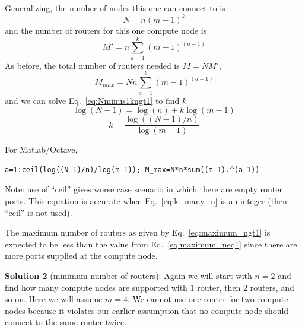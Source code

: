 \documentclass[pdftex]{article}
\begin{document}



Generalizing, the number of nodes this one can connect to is
\begin{equation}
 N=n(m-1)^k
 \label{eq:Nminus1kngt1}
\end{equation}
and the number of routers for this one compute node is
\begin{equation}
 M'=n\sum_{a=1}^{k} (m-1)^{(a-1)}
\end{equation}
As before, the total number of routers needed is $M=N M'$,
\begin{equation}
\boxed{
 M_{max}=N n\sum_{a=1}^{k} (m-1)^{(a-1)}
 }
 \label{eq:maximum_ngt1}
\end{equation}
and we can solve Eq.~\ref{eq:Nminus1kngt1} to find $k$
\begin{equation}
 \log(N-1)=\log(n) + k\log(m-1)
\end{equation}
\begin{equation}
 k=\frac{\log((N-1)/n)}{\log(m-1)}
 \label{eq:k_many_n}
\end{equation}

For Matlab/Octave,
\begin{verbatim}
a=1:ceil(log((N-1)/n)/log(m-1)); M_max=N*n*sum((m-1).^(a-1))
\end{verbatim}
Note: use of ``ceil'' gives worse case scenario in which there are empty router ports. This equation is accurate when Eq.~\ref{eq:k_many_n} is an integer (then ``ceil'' is not used).

The maximum number of routers as given by Eq.~\ref{eq:maximum_ngt1} is expected to be less than the value from Eq.~\ref{eq:maximum_neq1} since there are more ports supplied at the compute node.

\textbf{Solution 2} (minimum number of routers): Again we will start with $n=2$ and find how many compute nodes are supported with 1 router, then 2 routers, and so on. Here we will assume $m=4$. We cannot use one router for two compute nodes because it violates our earlier assumption that no compute node should connect to the same router twice.
\end{document}
